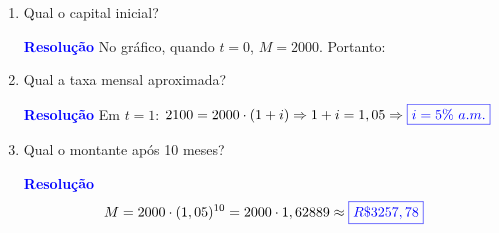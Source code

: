 \documentclass[11pt]{article}
\newcommand{\resposta}[1]{\textcolor{blue}{\boxed{#1}}}
\begin{document}
\begin{multicols}{2}
\begin{enumerate}[leftmargin=*, start=9]
\begin{enumerate}[label=\alph*)]
\item Qual o capital inicial?

\textbf{\textcolor{blue}{Resolução}} No gráfico, quando $t = 0$, $M = 2000$. Portanto: \resposta{C = R\$ 2000}

\item Qual a taxa mensal aproximada?

\textbf{\textcolor{blue}{Resolução}} Em $t = 1$: $2100 = 2000 \cdot (1 + i) \Rightarrow 1 + i = 1,05 \Rightarrow \resposta{i = 5\%\ a.m.}$

\item Qual o montante após 10 meses?

\textbf{\textcolor{blue}{Resolução}}
\[
M = 2000 \cdot (1,05)^{10} = 2000 \cdot 1,62889 \approx \resposta{R\$ 3257,78}
\]
\end{enumerate}
\end{enumerate}

\end{multicols}
\end{document}
